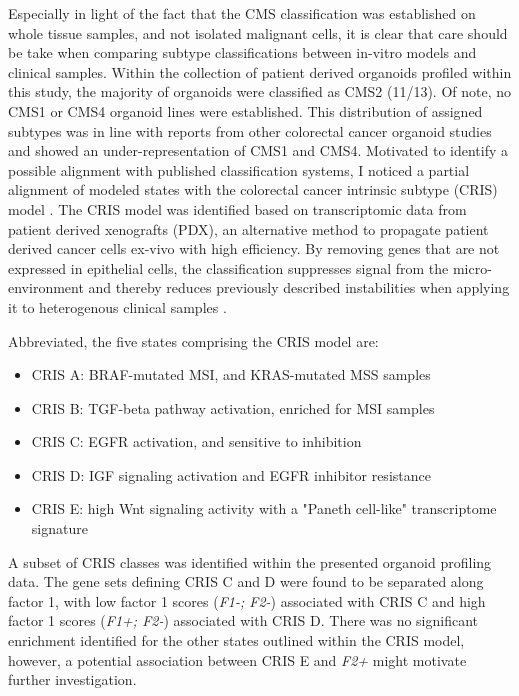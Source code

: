 \begin{flushleft}
Especially in light of the fact that the CMS classification was established on whole tissue samples, and not isolated malignant cells, it is clear that care should be take when comparing subtype classifications between in-vitro models and clinical samples. Within the collection of patient derived organoids profiled within this study, the majority of organoids were classified as CMS2 (11/13). Of note, no CMS1 or CMS4 organoid lines were established. This distribution of assigned subtypes was in line with reports from other colorectal cancer organoid studies \parencite{vandeweteringProspectiveDerivationLiving2015, schutteMolecularDissectionColorectal2017} and showed an under-representation of CMS1 and CMS4. Motivated to identify a possible alignment with published classification systems, I noticed a partial alignment of modeled states with the colorectal cancer intrinsic subtype (CRIS) model \parencite{isellaSelectiveAnalysisCancercell2017a}. The CRIS model was identified based on transcriptomic data from patient derived xenografts (PDX), an alternative method to propagate patient derived cancer cells ex-vivo with high efficiency. By removing genes that are not expressed in epithelial cells, the classification suppresses signal from the micro-environment and thereby reduces previously described instabilities when applying it to heterogenous clinical samples \parencite{dunneCancercellIntrinsicGene2017}.
\par

Abbreviated, the five states comprising the CRIS model are: 
\begin{itemize} 
    \item CRIS A: BRAF-mutated MSI, and KRAS-mutated MSS samples
    \item CRIS B: TGF-beta pathway activation, enriched for MSI samples 
    \item CRIS C: EGFR activation, and sensitive to inhibition
    \item CRIS D: IGF signaling activation and EGFR inhibitor resistance
    \item CRIS E: high Wnt signaling activity with a "Paneth cell-like" transcriptome signature
\end{itemize}

A subset of CRIS classes was identified within the presented organoid profiling data. The gene sets defining CRIS C and D were found to be separated along factor 1, with low factor 1 scores (\textit{F1-; F2-}) associated with CRIS C and high factor 1 scores (\textit{F1+; F2-}) associated with CRIS D. There was no significant enrichment identified for the other states outlined within the CRIS model, however, a potential association between CRIS E and \textit{F2+} might motivate further investigation.
\smallbreak


\end{flushleft}
